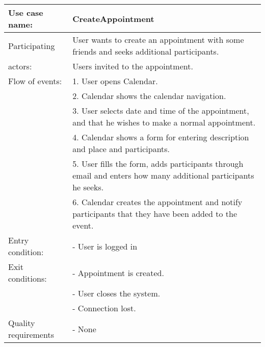 {\tabulinesep=1.2mm
\begin{tabu}{ | p{3cm} | p{13cm} |}
    \hline
    Use case name: 			& 		CreateAppointment\\ \hline
    Participating  			& 		User wants to create an appointment with some friends and seeks additional participants. \\
    actors:					&		Users invited to the appointment.\\ \hline
    Flow of events: 		& 		1. User opens Calendar. \\
							&		2. Calendar shows the calendar navigation.\\
							&		3. User selects date and time of the appointment, and that he wishes to make a normal appointment.\\
							&		4. Calendar shows a form for entering description and place and participants.\\
							&		5. User fills the form, adds participants through email and enters how many additional participants he seeks.\\
							&		6. Calendar creates the appointment and notify participants that they have been added to the event.\\ \hline
    Entry condition: 		& 		- User is logged in  \\ \hline
	Exit conditions: 		&		- Appointment is created.\\
							&		- User closes the system.\\
							&		- Connection lost.\\\hline
	Quality requirements	&	 	- None \\\hline
\end{tabu}
}
